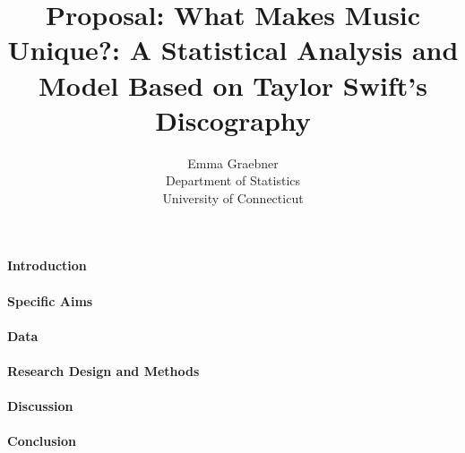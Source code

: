 \documentclass[12pt]{article}
\title{Proposal: What Makes Music Unique?: A Statistical Analysis and Model Based on Taylor Swift's Discography}
\author{Emma Graebner\\
  Department of Statistics\\
  University of Connecticut
}
\begin{document}
\maketitle


\paragraph{Introduction}

\citep{sloan2021taylor}
\citep{fogarty2021you} 
\citep{perone2017words}

\paragraph{Specific Aims}


\paragraph{Data}


\paragraph{Research Design and Methods}


\paragraph{Discussion}


\paragraph{Conclusion}




\end{document}
